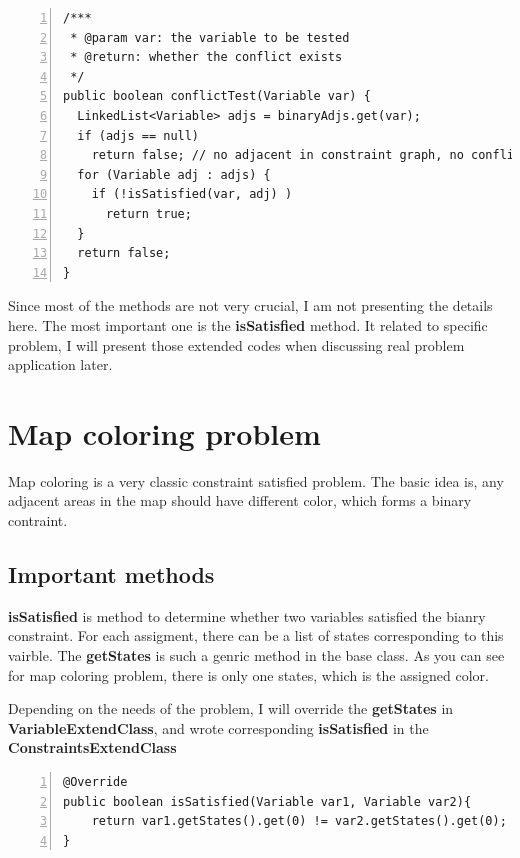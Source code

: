 \documentclass{article}
\begin{document}
\begin{lstlisting}[numbers=left]   
/***
 * @param var: the variable to be tested
 * @return: whether the conflict exists
 */
public boolean conflictTest(Variable var) {
  LinkedList<Variable> adjs = binaryAdjs.get(var);
  if (adjs == null)
    return false; // no adjacent in constraint graph, no conflict
  for (Variable adj : adjs) {
    if (!isSatisfied(var, adj) ) 
      return true;
  }
  return false;
}
\end{lstlisting}



Since most of the methods are not very crucial, I am not presenting the details here. The most important one is the \textbf{isSatisfied} method. It related to specific problem, I will present those extended codes when discussing real problem application later.
















\clearpage
\section{Map coloring problem}
Map coloring is a very classic constraint satisfied problem. The basic idea is, any adjacent areas in the map should have different color, which forms a binary contraint.

\subsection{Important methods}
\textbf{isSatisfied} is method to determine whether two variables satisfied the bianry constraint. For each assigment, there can be a list of states corresponding to this vairble. The \textbf{getStates} is such a genric method in the base class. As you can see for map coloring problem, there is only one states, which is the assigned color.

Depending on the needs of the problem, I will override the \textbf{getStates} in \textbf{VariableExtendClass}, and wrote corresponding \textbf{isSatisfied} in the \textbf{ConstraintsExtendClass}
\begin{lstlisting}[numbers=left]   
@Override
public boolean isSatisfied(Variable var1, Variable var2){
    return var1.getStates().get(0) != var2.getStates().get(0);
}
\end{lstlisting}
\end{document}
